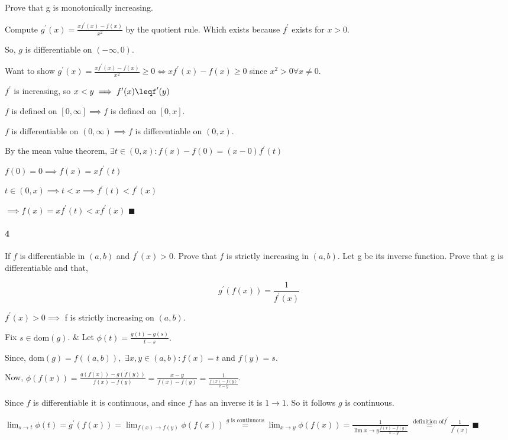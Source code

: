 \documentclass{article}
\begin{document}
Prove that g is monotonically increasing.


Compute $g^\prime(x) = \frac{xf^\prime(x) -f(x)}{x^2}$ by the
quotient rule. Which exists because $f^\prime$ exists for $x>0$.

So, $g$ is differentiable on $(-\infty,0)$.

Want to show $g^\prime(x) =  \frac{xf^\prime(x) -f(x)}{x^2} \geq 0 \iff
xf^\prime(x) - f(x) \geq 0$ since $x^2>0 \forall x \neq 0.$


$f^\prime$ is increasing, so $x < y \implies f^\prime (x) \leqf^\prime(y)$

$f$ is defined on $[0,\infty]\implies f$ is defined on $[0,x].$

$f$ is differentiable on $(0,\infty) \implies f$ is differentiable on
$(0,x)$.

By the mean value theorem, $\exists t\in(0,x): f(x) -f(0) =
(x-0)f^\prime(t)$

$f(0) = 0 \implies f(x) = xf^\prime(t)$

$t\in(0,x) \implies t<x \implies f^\prime(t)<f^\prime(x)$

$\implies f(x) =xf^\prime(t) < xf^\prime(x)$ $\blacksquare$






\paragraph{4} If $f$ is differentiable in $(a,b)$ and $f^\prime(x) >
0$. Prove that $f$ is strictly increasing in $(a,b)$. Let g be its inverse function. Prove that g is differentiable and that,

\[ g^\prime(f(x)) = \frac{1}{f^\prime(x)} \]


$f^\prime(x) > 0 \implies $ f is strictly increasing on $(a,b)$.

Fix $s \in \text{dom}(g)$. & Let $\phi(t) = \frac{g(t) - g(s)}{t-s}.$

Since, dom$(g) = f((a,b)),$ $\exists x,y \in (a,b): f(x)= t$ and
$f(y)=s$.

Now, $\phi(f(x)) = \frac{g(f(x)) - g(f(y))}{f(x)-f(y)} = \frac{x -
  y}{f(x)-f(y)} = \frac{1}{\frac{f(x)-f(y)}{x-y}}$.

Since $f$ is differentiable it is continuous, and since $f$ has an
inverse it is $1\rightarrow 1$. So it follows $g$ is continuous.

$ \lim_{s\rightarrow t} \phi(t) = g^\prime(f(x)) =\lim_{f(x)\rightarrow f(y)}
\phi(f(x)) \stackrel{g\text{ is continuous}}{=} \lim_{x\rightarrow y}
\phi(f(x)) = \frac{1}{\lim{x\rightarrow y} \frac{f(x)-f(y)}{x-y}}
\stackrel{\text{ definition of} f^\prime}{=} \frac{1}{f^\prime(x)}$
$\blacksquare$
\end{document}
